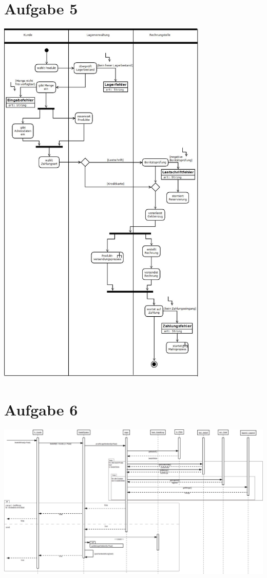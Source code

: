 \section*{Aufgabe 5}
\includegraphics*[width=0.75\textwidth,height=\textheight,keepaspectratio]{Aufgabe5.jpeg}
\section*{Aufgabe 6}
\includegraphics*[width=\textwidth,height=\textheight,keepaspectratio]{Aufgabe6.jpeg}
